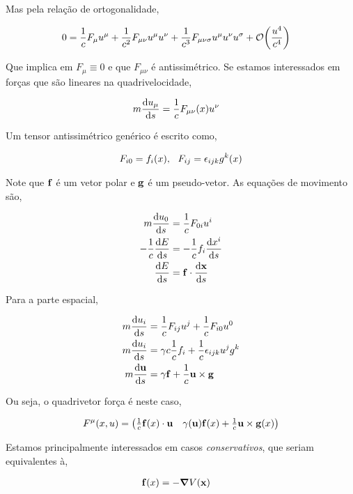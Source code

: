 \documentclass[twoside]{amsart}
\numberwithin{equation}{section}
\begin{document}
Mas pela relação de ortogonalidade,

\begin{align}
    0&=\frac1cF_{\mu}u^\mu+\frac{1}{c^2}F_{\mu\nu}u^\mu u^\nu+\frac{1}{c^3}F_{\mu\nu\sigma}u^\mu u^\nu u^\sigma+\mathcal O\qty(\frac{u^4}{c^4})
\end{align}

Que implica em $F_\mu\equiv0$ e que $F_{\mu\nu}$ é antissimétrico. Se estamos interessados em forças que são lineares na quadrivelocidade,

\begin{align}
    m\dv{u_\mu}{s}&=\frac1cF_{\mu\nu}\qty(x)u^\nu
\end{align}

Um tensor antissimétrico genérico é escrito como,

\begin{align}
    F_{i0}=f_i\qty(x),\ \ F_{ij}=\epsilon_{ijk}g^k\qty(x)
\end{align}

Note que $\vb f$ é um vetor polar e $\vb g$ é um pseudo-vetor. As equações de movimento são,

\begin{align}
    m\dv{u_0}{s}&=\frac1cF_{0i}u^i\\
    -\frac1c\dv{E}{s}&=-\frac1cf_i\dv{x^i}{s}\\
    \dv{E}{s}&=\vb f\cdot\dv{\vb x}{s}
\end{align}

Para a parte espacial,

\begin{align}
    m\dv{u_i}{s}&=\frac1cF_{ij}u^j+\frac1cF_{i0}u^0\\
    m\dv{u_i}{s}&=\gamma c \frac1cf_i+\frac1c\epsilon_{ijk}u^jg^k\\
    m\dv{\vb u}{s}&=\gamma\vb f+\frac1c\vb u\times\vb g
\end{align}

Ou seja, o quadrivetor força é neste caso,

\begin{align}
    F^\mu\qty(x,u)=\mqty(\frac1c\vb f\qty(x)\cdot \vb u&\gamma\qty(\vb u) \vb f\qty(x)+\frac1c\vb u\times\vb g\qty(x))
\end{align}

Estamos principalmente interessados em casos \emph{conservativos}, que seriam equivalentes à,

\begin{align}
    \vb f\qty(x)&=-\grad V\qty(\vb x)
\end{align}
\end{document}
